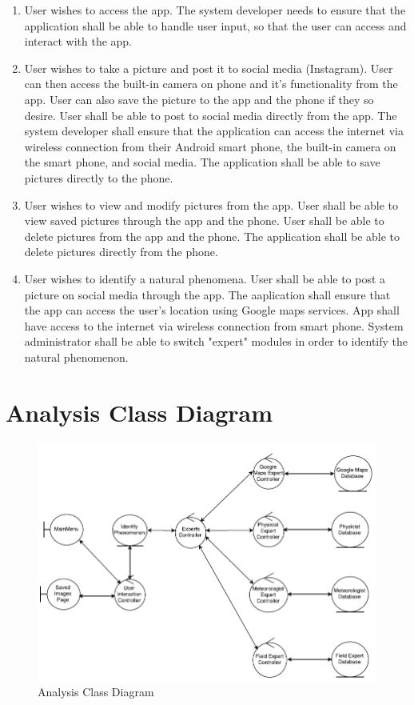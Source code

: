 \documentclass[]{article}
\begin{document}
\begin{enumerate}
	\item User wishes to access the app. The system developer needs to ensure that the application shall be able to handle user input, so that the user can access and interact with the app.
	\item User wishes to take a picture and post it to social media (Instagram).  User can then access the built-in camera on phone and it's functionality from the app.  User can also save the picture to the app and the phone if they so desire.  User shall be able to post to social media directly from the app.  The system developer shall ensure that the application can access the internet via wireless connection from their Android smart phone, the built-in camera on the smart phone, and social media.  The application shall be able to save pictures directly to the phone.
	\item User wishes to view and modify pictures from the app.  User shall be able to view saved pictures through the app and the phone.  User shall be able to delete pictures from the app and the phone.  The application shall be able to delete pictures directly from the phone.
	\item User wishes to identify a natural phenomena. User shall be able to post a picture on social media through the app.  The aaplication shall ensure that the app can access the user's location using Google maps services. App shall have access to the internet via wireless connection from smart phone. System administrator shall be able to switch "expert" modules in order to identify the natural phenomenon. 
\end{enumerate}

\section{Analysis Class Diagram}

\begin{figure}[!hb]
	\includegraphics[width=\linewidth]{AnalysisClassDiagram.png}
	\caption{Analysis Class Diagram}
\end{figure}
\end{document}
